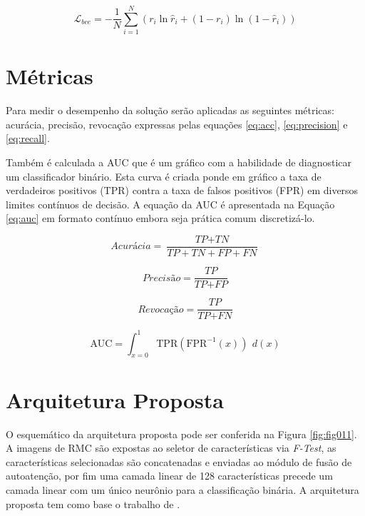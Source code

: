 \begin{equation}
\mathcal{L}_{bce} = -\frac{1}{N} \sum_{i=1}^N
(r_i \ln \hat{r}_i + (1 - r_i) \ln (1 - \hat{r}_i))
\label{eq:bce}
\end{equation}

\section{Métricas}
\label{subsec:cap4_metrics}
Para medir o desempenho da solução serão aplicadas as seguintes métricas: acurácia, precisão, revocação expressas pelas equações \ref{eq:acc}, \ref{eq:precision} e \ref{eq:recall}.

Também é calculada a \gls{AUC} que é um gráfico com a habilidade de diagnosticar um classificador binário. Esta curva é criada ponde em gráfico a taxa de verdadeiros positivos (TPR) contra a taxa de falsos positivos (FPR) em diversos limites contínuos de decisão. A equação da \gls{AUC} é apresentada na Equação \ref{eq:auc} em formato contínuo embora seja prática comum discretizá-lo.


\begin{equation}
  \textit{Acurácia} = \frac{\textit{TP} + \textit{TN}}{\textit{TP} + \textit{TN} + \textit{FP} + \textit{FN}}
  \label{eq:acc}
\end{equation}

\begin{equation}
  \textit{Precisão} = \frac{\textit{TP}}{\textit{TP} + \textit{FP}}
  \label{eq:precision}
\end{equation}

\begin{equation}
  \textit{Revocação} = \frac{\textit{TP}}{\textit{TP} + \textit{FN}}
  \label{eq:recall}
\end{equation}

\begin{equation}
  \text{AUC} = \int_{x=0}^{1} \text{TPR}(\text{FPR}^{-1}(x)) \ \, d(x)
  \label{eq:auc}
\end{equation}

\section{Arquitetura Proposta}
\label{subsec:cap4_architecture}

O esquemático da arquitetura proposta pode ser conferida na Figura \ref{fig:fig011}. A imagens de \gls{RMC} são expostas ao seletor de características via \textit{F-Test}, as características selecionadas são concatenadas e enviadas ao módulo de fusão de autoatenção, por fim uma camada linear de 128 características precede um camada linear com um único neurônio para a classificação binária. A arquitetura proposta tem como base o trabalho de \cite{aiSelfAttentionBasedFusion2023}.

